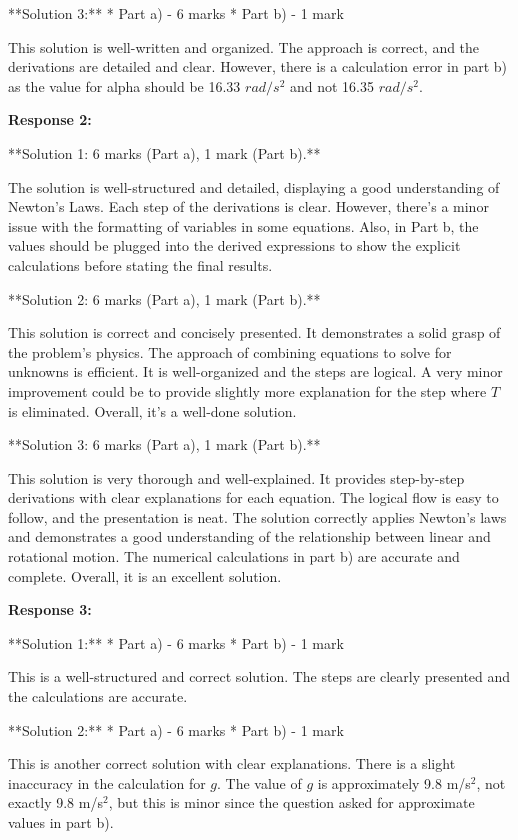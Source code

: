 \documentclass[a4paper,11pt]{article}
\begin{document}
**Solution 3:**
*   Part a) - 6 marks
*   Part b) - 1 mark

This solution is well-written and organized. The approach is correct, and the derivations are detailed and clear. However, there is a calculation error in part b) as the value for alpha should be 16.33 $rad/s^2$ and not 16.35 $rad/s^2$.

\bigskip    
\textbf{Response 2:}

**Solution 1: 6 marks (Part a), 1 mark (Part b).**

The solution is well-structured and detailed, displaying a good understanding of Newton's Laws. Each step of the derivations is clear. However, there's a minor issue with the formatting of variables in some equations. Also, in Part b, the values should be plugged into the derived expressions to show the explicit calculations before stating the final results.

**Solution 2: 6 marks (Part a), 1 mark (Part b).**

This solution is correct and concisely presented. It demonstrates a solid grasp of the problem's physics. The approach of combining equations to solve for unknowns is efficient. It is well-organized and the steps are logical. A very minor improvement could be to provide slightly more explanation for the step where \( T \) is eliminated. Overall, it's a well-done solution.

**Solution 3: 6 marks (Part a), 1 mark (Part b).**

This solution is very thorough and well-explained. It provides step-by-step derivations with clear explanations for each equation. The logical flow is easy to follow, and the presentation is neat. The solution correctly applies Newton's laws and demonstrates a good understanding of the relationship between linear and rotational motion. The numerical calculations in part b) are accurate and complete. Overall, it is an excellent solution.

\bigskip    
\textbf{Response 3:}

**Solution 1:**
*   Part a) - 6 marks
*   Part b) - 1 mark

This is a well-structured and correct solution. The steps are clearly presented and the calculations are accurate. 

**Solution 2:**
*   Part a) - 6 marks
*   Part b) - 1 mark

This is another correct solution with clear explanations. There is a slight inaccuracy in the calculation for \( g \). The value of \( g \) is approximately 9.8 m/s\(^2\), not exactly 9.8 m/s\(^2\), but this is minor since the question asked for approximate values in part b).
\end{document}
